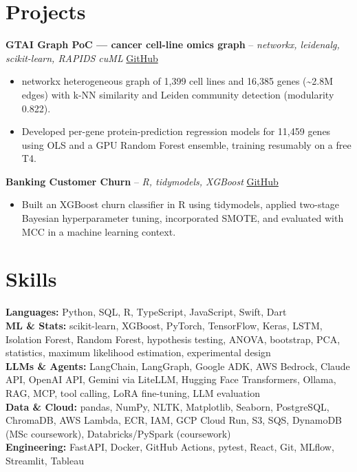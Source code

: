 \documentclass[a4paper,10pt]{article}
\begin{document}
\section{Projects}
\noindent\textbf{GTAI Graph PoC — cancer cell-line omics graph} -- \textit{networkx, leidenalg, scikit-learn, RAPIDS cuML} \hfill \href{https://github.com/Thiruvel-AP/GTAI-GraphPOC}{GitHub}
\begin{itemize}
  \item networkx heterogeneous graph of 1,399 cell lines and 16,385 genes (\textasciitilde{}2.8M edges) with k-NN similarity and Leiden community detection (modularity 0.822).
  \item Developed per-gene protein-prediction regression models for 11,459 genes using OLS and a GPU Random Forest ensemble, training resumably on a free T4.
\end{itemize}
\noindent\textbf{Banking Customer Churn} -- \textit{R, tidymodels, XGBoost} \hfill \href{https://github.com/Thiruvel-AP/Banking-Customer-Churn-Prediction}{GitHub}
\begin{itemize}
  \item Built an XGBoost churn classifier in R using tidymodels, applied two-stage Bayesian hyperparameter tuning, incorporated SMOTE, and evaluated with MCC in a machine learning context.
\end{itemize}

\section{Skills}
\textbf{Languages:} Python, SQL, R, TypeScript, JavaScript, Swift, Dart\\
\textbf{ML \& Stats:} scikit-learn, XGBoost, PyTorch, TensorFlow, Keras, LSTM, Isolation Forest, Random Forest, hypothesis testing, ANOVA, bootstrap, PCA, statistics, maximum likelihood estimation, experimental design\\
\textbf{LLMs \& Agents:} LangChain, LangGraph, Google ADK, AWS Bedrock, Claude API, OpenAI API, Gemini via LiteLLM, Hugging Face Transformers, Ollama, RAG, MCP, tool calling, LoRA fine-tuning, LLM evaluation\\
\textbf{Data \& Cloud:} pandas, NumPy, NLTK, Matplotlib, Seaborn, PostgreSQL, ChromaDB, AWS Lambda, ECR, IAM, GCP Cloud Run, S3, SQS, DynamoDB (MSc coursework), Databricks/PySpark (coursework)\\
\textbf{Engineering:} FastAPI, Docker, GitHub Actions, pytest, React, Git, MLflow, Streamlit, Tableau
\end{document}
